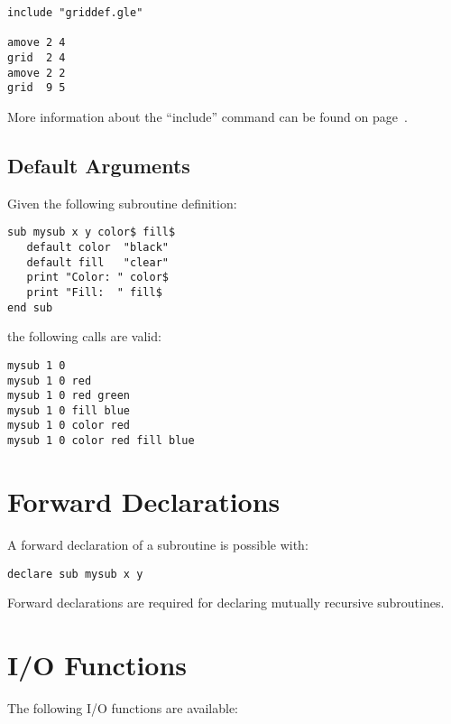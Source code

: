 \preglecode{}
\begin{Verbatim}
include "griddef.gle"

amove 2 4
grid  2 4
amove 2 2
grid  9 5
\end{Verbatim}
\postglecode{}

More information about the ``include'' command can be found on page~\pageref{incl:cmnd}.

\subsection{Default Arguments}

Given the following subroutine definition:

\preglecode{}
\begin{Verbatim}
sub mysub x y color$ fill$
   default color  "black"
   default fill   "clear"
   print "Color: " color$
   print "Fill:  " fill$
end sub
\end{Verbatim}
\postglecode{}

\noindent{}the following calls are valid:

\preglecode{}
\begin{Verbatim}
mysub 1 0
mysub 1 0 red
mysub 1 0 red green
mysub 1 0 fill blue
mysub 1 0 color red
mysub 1 0 color red fill blue
\end{Verbatim}
\postglecode{}

\section{Forward Declarations}

A forward declaration of a subroutine is possible with:

\preglecode{}
\begin{Verbatim}
declare sub mysub x y
\end{Verbatim}
\postglecode{}

\noindent{}Forward declarations are required for declaring mutually recursive subroutines.

\section{I/O Functions}
  
  
 

The following I/O functions are available:

